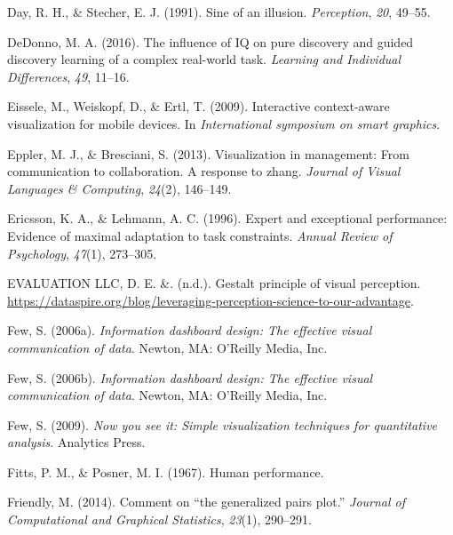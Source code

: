 \documentclass[print]{nuthesis}
\newlength{\cslhangindent}
\newenvironment{CSLReferences}[2]%
{\setlength{\parindent}{0pt}%
\everypar{\setlength{\hangindent}{\cslhangindent}}\ignorespaces}%
{\par}
\begin{document}
\begin{CSLReferences}{1}{0}
\leavevmode{}%
Day, R. H., \& Stecher, E. J. (1991). Sine of an illusion. \emph{Perception}, \emph{20}, 49--55.

\leavevmode{}%
DeDonno, M. A. (2016). The influence of IQ on pure discovery and guided discovery learning of a complex real-world task. \emph{Learning and Individual Differences}, \emph{49}, 11--16.

\leavevmode{}%
Eissele, M., Weiskopf, D., \& Ertl, T. (2009). Interactive context-aware visualization for mobile devices. In \emph{International symposium on smart graphics}.

\leavevmode{}%
Eppler, M. J., \& Bresciani, S. (2013). Visualization in management: From communication to collaboration. A response to zhang. \emph{Journal of Visual Languages \& Computing}, \emph{24}(2), 146--149.

\leavevmode{}%
Ericsson, K. A., \& Lehmann, A. C. (1996). Expert and exceptional performance: Evidence of maximal adaptation to task constraints. \emph{Annual Review of Psychology}, \emph{47}(1), 273--305.

\leavevmode{}%
EVALUATION LLC, D. E. \&. (n.d.). Gestalt principle of visual perception. \url{https://dataspire.org/blog/leveraging-perception-science-to-our-advantage}.

\leavevmode{}%
Few, S. (2006a). \emph{Information dashboard design: The effective visual communication of data}. Newton, MA: O'Reilly Media, Inc.

\leavevmode{}%
Few, S. (2006b). \emph{Information dashboard design: The effective visual communication of data}. Newton, MA: O'Reilly Media, Inc.

\leavevmode{}%
Few, S. (2009). \emph{Now you see it: Simple visualization techniques for quantitative analysis}. Analytics Press.

\leavevmode{}%
Fitts, P. M., \& Posner, M. I. (1967). Human performance.

\leavevmode{}%
Friendly, M. (2014). Comment on {``the generalized pairs plot.''} \emph{Journal of Computational and Graphical Statistics}, \emph{23}(1), 290--291.


\end{CSLReferences}
\end{document}
